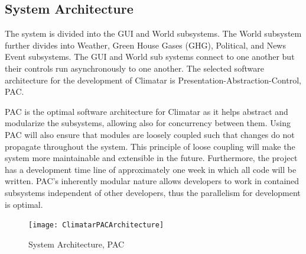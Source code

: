 \documentclass[]{article}
\begin{document}
\subsection{System Architecture}
\label{sub:system_architecture}

The system is divided into the GUI and World subsystems. The World subsystem further divides into Weather, Green House Gases (GHG), Political, and News Event subsystems. The GUI and World sub systems connect to one another but their controls run asynchronously to one another. The selected software architecture for the development of Climatar is Presentation-Abstraction-Control, PAC.

\vspace{3mm}

PAC is the optimal software architecture for Climatar as it helps abstract and modularize the subsystems, allowing also for concurrency between them. Using PAC will also ensure that modules are loosely coupled such that changes do not propagate throughout the system. This principle of loose coupling will make the system more maintainable and extensible in the future. Furthermore, the project has a development time line of approximately one week in which all code will be written. PAC's inherently modular nature allows developers to work in contained subsystems independent of other developers, thus the parallelism for development is optimal.

\begin{figure}[ht!]
\centering
\texttt{[image: ClimatarPACArchitecture]}
\caption{System Architecture, PAC\label{pacarch}}
\end{figure}

\end{document}
